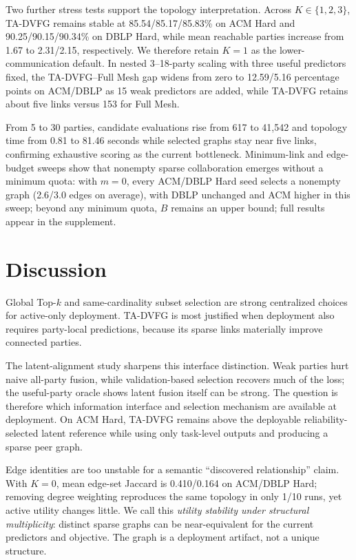 \documentclass[letterpaper]{article} %
\newcommand{\method}{\textsc{TA-DVFG}}
\begin{document}
Two further stress tests support the topology interpretation. Across
$K\in\{1,2,3\}$, \method{} remains stable at
85.54/85.17/85.83\% on ACM Hard and 90.25/90.15/90.34\% on DBLP Hard,
while mean reachable parties increase from 1.67 to 2.31/2.15, respectively.
We therefore retain $K=1$ as the lower-communication default. In nested
3--18-party scaling with three useful predictors fixed, the
\method{}--Full Mesh gap widens from zero to 12.59/5.16 percentage points
on ACM/DBLP as 15 weak predictors are added, while \method{} retains about
five links versus 153 for Full Mesh.

From 5 to 30 parties, candidate evaluations rise from 617 to 41,542 and
topology time from 0.81 to 81.46 seconds while selected graphs stay near five
links, confirming exhaustive scoring as the current bottleneck. Minimum-link
and edge-budget sweeps show that nonempty sparse collaboration emerges without
a minimum quota: with $m=0$, every ACM/DBLP Hard seed selects a nonempty graph
(2.6/3.0 edges on average), with DBLP unchanged and ACM higher in this sweep;
beyond any minimum quota, $B$ remains an upper bound; full results appear in
the supplement.



\section{Discussion}

Global Top-$k$ and same-cardinality subset selection are strong centralized
choices for active-only deployment. \method{} is most justified when deployment
also requires party-local predictions, because its sparse links materially
improve connected parties.

The latent-alignment study sharpens this interface distinction. Weak parties
hurt naive all-party fusion, while validation-based selection recovers much of
the loss; the useful-party oracle shows latent fusion itself can be strong. The
question is therefore which information interface and selection mechanism are
available at deployment. On ACM Hard, \method{} remains above the deployable
reliability-selected latent reference while using only task-level outputs and
producing a sparse peer graph.

Edge identities are too unstable for a semantic ``discovered relationship''
claim. With $K=0$, mean edge-set Jaccard is 0.410/0.164 on ACM/DBLP Hard;
removing degree weighting reproduces the same topology in only 1/10 runs, yet
active utility changes little. We call this \emph{utility stability under
structural multiplicity}: distinct sparse graphs can be near-equivalent for the
current predictors and objective. The graph is a deployment artifact, not a unique structure.
\end{document}
